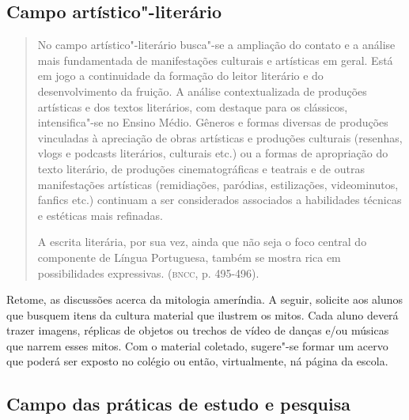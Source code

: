 \documentclass[12pt]{extarticle}
\begin{document}
\subsection{Campo artístico"-literário}

\begin{quote}
No campo artístico"-literário busca"-se a ampliação do contato e a
análise mais fundamentada de manifestações culturais e artísticas em
geral. Está em jogo a continuidade da formação do leitor literário e do
desenvolvimento da fruição. A análise contextualizada de produções
artísticas e dos textos literários, com destaque para os clássicos,
intensifica"-se no Ensino Médio. Gêneros e formas diversas de produções
vinculadas à apreciação de obras artísticas e produções culturais
(resenhas, vlogs e podcasts literários, culturais etc.) ou a formas de
apropriação do texto literário, de produções cinematográficas e teatrais
e de outras manifestações artísticas (remidiações, paródias,
estilizações, videominutos, fanfics etc.) continuam a ser considerados
associados a habilidades técnicas e estéticas mais refinadas.

A escrita literária, por sua vez, ainda que não seja o foco central do
componente de Língua Portuguesa, também se mostra rica em possibilidades
expressivas. (\textsc{bncc}, p. 495-496).
\end{quote}

Retome, as discussões acerca da mitologia ameríndia. A seguir,
  solicite aos alunos que busquem itens da cultura material que ilustrem
  os mitos. Cada aluno deverá trazer imagens, réplicas de objetos ou
  trechos de vídeo de danças e/ou músicas que narrem esses mitos. Com o
  material coletado, sugere"-se formar um acervo que poderá ser exposto
  no colégio ou então, virtualmente, ná página da escola.

\subsection{Campo das práticas de estudo e pesquisa}
\end{document}
